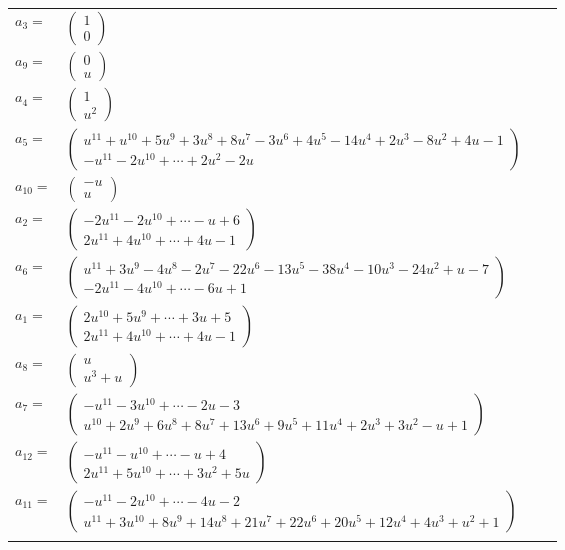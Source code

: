 \documentclass[1p]{elsarticle_modified}
\theoremstyle{definition}
\begin{document}
\begin{tabular}{m{7pt} m{180pt} m{7pt} m{180pt} }
\flushright $a_{3}=$&$\begin{pmatrix}1\\0\end{pmatrix}$ \\
\flushright $a_{9}=$&$\begin{pmatrix}0\\u\end{pmatrix}$ \\
\flushright $a_{4}=$&$\begin{pmatrix}1\\u^2\end{pmatrix}$ \\
\flushright $a_{5}=$&$\begin{pmatrix}u^{11}+u^{10}+5 u^9+3 u^8+8 u^7-3 u^6+4 u^5-14 u^4+2 u^3-8 u^2+4 u-1\\- u^{11}-2 u^{10}+\cdots+2 u^2-2 u\end{pmatrix}$ \\
\flushright $a_{10}=$&$\begin{pmatrix}- u\\u\end{pmatrix}$ \\
\flushright $a_{2}=$&$\begin{pmatrix}-2 u^{11}-2 u^{10}+\cdots- u+6\\2 u^{11}+4 u^{10}+\cdots+4 u-1\end{pmatrix}$ \\
\flushright $a_{6}=$&$\begin{pmatrix}u^{11}+3 u^9-4 u^8-2 u^7-22 u^6-13 u^5-38 u^4-10 u^3-24 u^2+u-7\\-2 u^{11}-4 u^{10}+\cdots-6 u+1\end{pmatrix}$ \\
\flushright $a_{1}=$&$\begin{pmatrix}2 u^{10}+5 u^9+\cdots+3 u+5\\2 u^{11}+4 u^{10}+\cdots+4 u-1\end{pmatrix}$ \\
\flushright $a_{8}=$&$\begin{pmatrix}u\\u^3+u\end{pmatrix}$ \\
\flushright $a_{7}=$&$\begin{pmatrix}- u^{11}-3 u^{10}+\cdots-2 u-3\\u^{10}+2 u^9+6 u^8+8 u^7+13 u^6+9 u^5+11 u^4+2 u^3+3 u^2- u+1\end{pmatrix}$ \\
\flushright $a_{12}=$&$\begin{pmatrix}- u^{11}- u^{10}+\cdots- u+4\\2 u^{11}+5 u^{10}+\cdots+3 u^2+5 u\end{pmatrix}$ \\
\flushright $a_{11}=$&$\begin{pmatrix}- u^{11}-2 u^{10}+\cdots-4 u-2\\u^{11}+3 u^{10}+8 u^9+14 u^8+21 u^7+22 u^6+20 u^5+12 u^4+4 u^3+u^2+1\end{pmatrix}$\\&\end{tabular}
\end{document}
